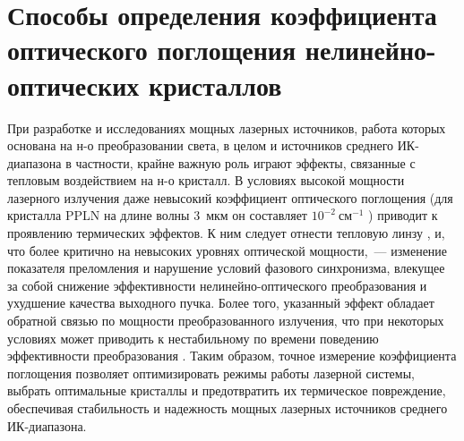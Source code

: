 \section{Способы определения коэффициента оптического поглощения нелинейно-оптических кристаллов}\label{sec:review/abs}

При разработке и исследованиях мощных лазерных источников, работа которых основана на н-о преобразовании света, в целом и источников среднего ИК-диапазона в частности, крайне важную роль играют эффекты, связанные с тепловым воздействием на н-о кристалл. В условиях высокой мощности лазерного излучения даже невысокий коэффициент оптического поглощения (для кристалла PPLN на длине волны 3~мкм он составляет $10^{-2}~\text{см}^{-1}$ \cite{leidinger2015comparative}) приводит к проявлению термических эффектов. К ним следует отнести тепловую линзу \cite{peng2015high}, и, что более критично на невысоких уровнях оптической мощности,~--- изменение показателя преломления и нарушение условий фазового синхронизма, влекущее за собой снижение эффективности нелинейно-оптического преобразования и ухудшение качества выходного пучка. Более того, указанный эффект обладает обратной связью по мощности преобразованного излучения, что при некоторых условиях может приводить к нестабильному по времени поведению эффективности преобразования \cite{dmitriev2004prikladnaya, zotov2024equivalent}. Таким образом, точное измерение коэффициента поглощения позволяет оптимизировать режимы работы лазерной системы, выбрать оптимальные кристаллы и предотвратить их термическое повреждение, обеспечивая стабильность и надежность мощных лазерных источников среднего ИК-диапазона.






